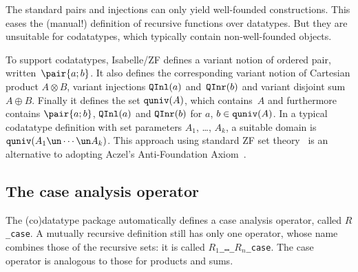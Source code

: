 The standard pairs and injections can only yield well-founded
constructions.  This eases the (manual!) definition of recursive functions
over datatypes.  But they are unsuitable for codatatypes, which typically
contain non-well-founded objects.

To support codatatypes, Isabelle/ZF defines a variant notion of ordered
pair, written~$\pair{a;b}$.  It also defines the corresponding variant
notion of Cartesian product $A\otimes B$, variant injections $\hbox{\tt QInl}(a)$
and~$\hbox{\tt QInr}(b)$ and variant disjoint sum $A\oplus B$.  Finally it defines
the set $\hbox{\tt quniv}(A)$, which contains~$A$ and furthermore contains
$\pair{a;b}$, $\hbox{\tt QInl}(a)$ and $\hbox{\tt QInr}(b)$ for $a$, $b\in\hbox{\tt quniv}(A)$.  In a
typical codatatype definition with set parameters $A_1$, \ldots, $A_k$, a
suitable domain is $\quniv(A_1\un\cdots\un A_k)$.  This approach using
standard ZF set theory~\cite{paulson-final} is an alternative to adopting
Aczel's Anti-Foundation Axiom~\cite{aczel88}.

\subsection{The case analysis operator}
The (co)datatype package automatically defines a case analysis operator,
called {\tt$R$\_case}.  A mutually recursive definition still has only one
operator, whose name combines those of the recursive sets: it is called
{\tt$R_1$\_\ldots\_$R_n$\_case}.  The case operator is analogous to those
for products and sums.

